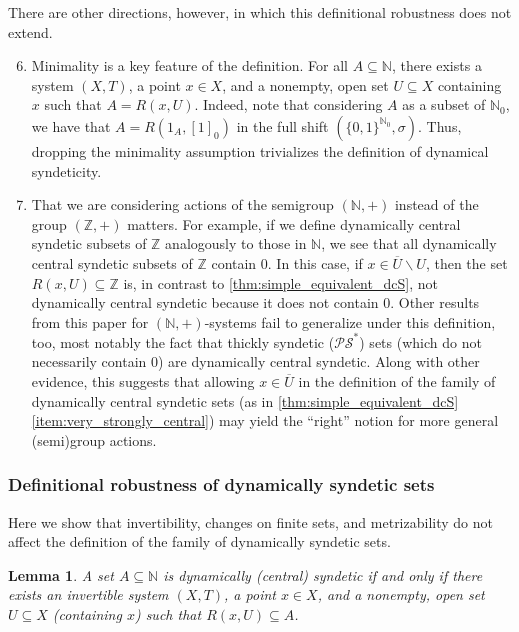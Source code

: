 \documentclass[letter,11pt]{article}
\theoremstyle{plain}
\newtheorem{lemma}[theorem]{Lemma}
\theoremstyle{definition}
\theoremstyle{plain}
\theoremstyle{plain}
\numberwithin{equation}{section}
\newcommand{\N}{\mathbb{N}}
\newcommand{\Z}{\mathbb{Z}}
\renewcommand{\setminus}{\backslash}
\newcommand{\PS}{\mathcal{PS}}
\begin{document}
There are other directions, however, in which this definitional robustness does not extend.
\begin{enumerate}
\setcounter{enumi}{5}
    \item Minimality is a key feature of the definition.  For all $A \subseteq \N$, there exists a system $(X,T)$, a point $x \in X$, and a nonempty, open set $U \subseteq X$ containing $x$ such that $A = R(x,U)$.  Indeed, note that considering $A$ as a subset of $\N_0$, we have that $A = R(1_{A},[1]_0)$ in the full shift $(\{0,1\}^{\N_0},\sigma)$.  Thus, dropping the minimality assumption trivializes the definition of dynamical syndeticity.

    \item \label{item_generalization_to_z} That we are considering actions of the semigroup $(\N,+)$ instead of the group $(\Z,+)$ matters.  For example, if we define dynamically central syndetic subsets of $\Z$ analogously to those in $\N$, we see that all dynamically central syndetic subsets of $\Z$ contain 0.  In this case, if $x \in \overline{U} \setminus U$, then the set $R(x,U) \subseteq \Z$ is, in contrast to \cref{thm:simple_equivalent_dcS}, not dynamically central syndetic because it does not contain 0.  Other results from this paper for $(\N,+)$-systems fail to generalize under this definition, too, most notably the fact that thickly syndetic ($\PS^*$) sets (which do not necessarily contain 0) are dynamically central syndetic. Along with other evidence, this suggests that allowing $x \in \overline{U}$ in the definition of the family of dynamically central syndetic sets (as in \cref{thm:simple_equivalent_dcS} \eqref{item:very_strongly_central}) may yield the ``right'' notion for more general (semi)group actions.
\end{enumerate}



\subsubsection{Definitional robustness of dynamically syndetic sets}
\label{sec_dsyndetic_robust}

Here we show that invertibility, changes on finite sets, and metrizability do not affect the definition of the family of dynamically syndetic sets.

\begin{lemma}
\label{lemma_may_assume_invertible}
    A set $A \subseteq \N$ is dynamically (central) syndetic if and only if there exists an invertible system $(X,T)$, a point $x \in X$, and a nonempty, open set $U \subseteq X$ (containing $x$) such that $R(x,U) \subseteq A$.
\end{lemma}
\end{document}
